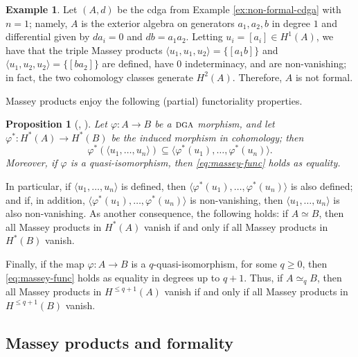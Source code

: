 \documentclass{article}
\numberwithin{equation}{section}
\newtheorem{proposition}[theorem]{Proposition}
\theoremstyle{definition}
\newtheorem{example}[theorem]{Example}
\newcommand{\dga}{\ensuremath{\textsc{dga}}}
\begin{document}
\begin{example}
\label{ex:non-formal-cdga-again}
Let $(A,d)$ be the cdga from Example \ref{ex:non-formal-cdga} with $n=1$; 
namely, $A$ is the exterior algebra on generators $a_1,a_2,b$ in degree $1$ 
and differential given by $d a_i=0$ and $d b=a_1a_2$. Letting $u_i=[a_i]\in H^1(A)$, we 
have that the triple Massey products $\langle u_1, u_1, u_2\rangle=\{[a_1b]\}$ and 
$\langle u_1, u_2, u_2\rangle=\{[ba_2]\}$ are defined, have $0$ indeterminacy, 
and are non-van\-ishing; in fact, the two cohomology classes generate $H^2(A)$.
Therefore, $A$ is not formal.
\end{example}

Massey products enjoy the following (partial) functoriality properties.

\begin{proposition}[\cite{Kraines}, \cite{May}]
\label{prop:massey-natural}
 Let $\varphi\colon A\to B$ be a $\dga$ morphism, and let 
$\varphi^*\colon H^*(A)\to H^*(B)$ be the induced morphism 
in cohomology; then 
\begin{equation}
\label{eq:massey-func}
\varphi^*(\langle u_1, \dots, u_n\rangle) 
\subseteq \langle \varphi^*(u_1), \dots, \varphi^*(u_n)\rangle .
\end{equation}
Moreover, if $\varphi$ is a quasi-isomorphism, then \eqref{eq:massey-func} 
holds as equality.
\end{proposition}

In particular, if $\langle u_1, \dots, u_n\rangle$ is defined, then 
$\langle \varphi^*(u_1), \dots, \varphi^*(u_n)\rangle$ is also defined; 
and if, in addition, $\langle \varphi^*(u_1), \dots, \varphi^*(u_n)\rangle$ is 
non-vanishing, then $\langle u_1, \dots, u_n\rangle$ 
is also non-vanishing. As another consequence, the following holds: 
if $A\simeq B$, then all Massey products in $H^*(A)$ vanish 
if and only if all Massey products in $H^*(B)$ vanish.

Finally, if the map $\varphi\colon A\to B$ is a $q$-quasi-isomorphism, 
for some $q\ge 0$, then \eqref{eq:massey-func} holds as equality in 
degrees up to $q+1$. Thus, if $A\simeq_{q} B$, then all Massey 
products in $H^{\le q+1}(A)$ vanish if and only if all Massey 
products in $H^{\le q+1}(B)$ vanish.

\subsection{Massey products and formality}
\label{subsec:massey-formal}
\end{document}
